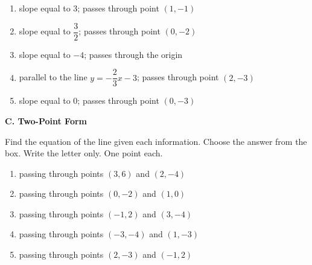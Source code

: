     \begin{enumerate}[resume]
    		\item slope equal to $ 3 $; passes through point $ (1,-1) $ %
    		\item slope equal to $ \dfrac{3}{2}  $; passes through point $ ( 0, -2 ) $ %
    		\item slope equal to $ -4 $; passes through the origin %
    		\item parallel to the line $ y = -\dfrac{2}{3}x - 3$; passes through point $ ( 2, -3) $ %
    		\item slope equal to $ 0 $; passes through point $ (0, -3 ) $ %
    \end{enumerate}
    
    \vspace*{1.3ex}

    \noindent \textbf{C. Two-Point Form} 
    
    Find the equation of the line given each information. Choose the answer from the box. Write the letter only. One point each.
    
    \begin{center}  
    \end{center}
    
    \begin{enumerate}[resume]
    		\item  passing through points $ (3, 6) $ and $ (2, -4) $ %
    		\item  passing through points $ ( 0, -2 ) $ and $ ( 1, 0 ) $ %
    		\item  passing through points $ ( -1, 2 ) $ and $ ( 3, -4 ) $ %
    		\item  passing through points $ ( -3, -4 ) $ and $ ( 1, -3 ) $ %
    		\item  passing through points $ ( 2, -3 ) $ and $ ( -1, 2 ) $ %
    \end{enumerate}
    \newpage
    
